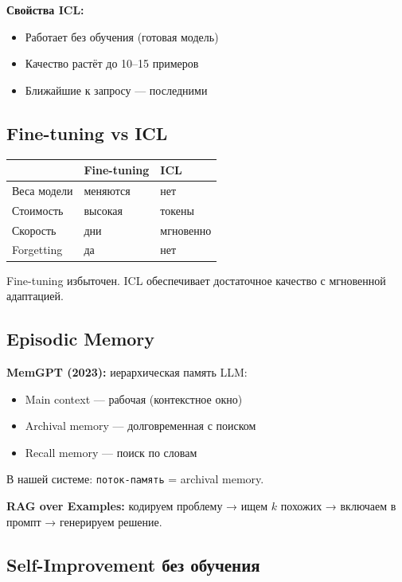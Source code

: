 \documentclass[10pt, oneside]{article}
\begin{document}
\textbf{Свойства ICL:}
\begin{itemize}
  \item Работает без обучения (готовая модель)
  \item Качество растёт до 10--15 примеров
  \item Ближайшие к запросу --- последними
\end{itemize}

\subsection{Fine-tuning vs ICL}

\begin{tabular}{@{}lll@{}}
  \toprule
  & \textbf{Fine-tuning} & \textbf{ICL} \\
  \midrule
  Веса модели & меняются & нет \\
  Стоимость & высокая & токены \\
  Скорость & дни & мгновенно \\
  Forgetting & да & нет \\
  \bottomrule
\end{tabular}

\begin{infobox}[title={Вывод}]
Fine-tuning избыточен. ICL обеспечивает достаточное
качество с мгновенной адаптацией.
\end{infobox}

\subsection{Episodic Memory}

\textbf{MemGPT (2023):} иерархическая память LLM:
\begin{itemize}
  \item Main context --- рабочая (контекстное окно)
  \item Archival memory --- долговременная с поиском
  \item Recall memory --- поиск по словам
\end{itemize}

В нашей системе: \texttt{поток-память} = archival memory.

\textbf{RAG over Examples:}
кодируем проблему → ищем $k$ похожих → включаем в промпт → генерируем решение.

\subsection{Self-Improvement без обучения}
\end{document}
